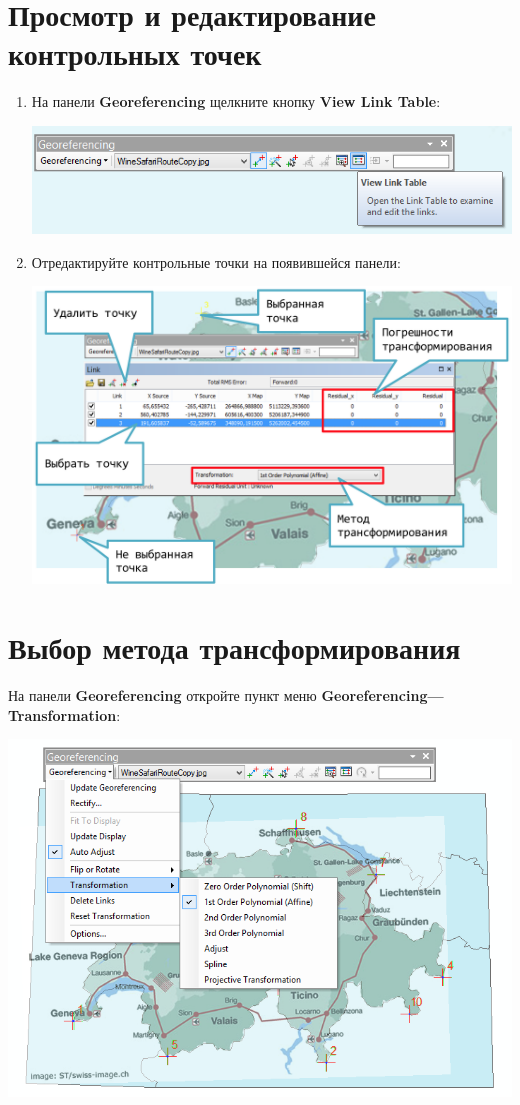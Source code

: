 \documentclass[]{book}
\theoremstyle{definition}
\theoremstyle{definition}
\theoremstyle{definition}
\theoremstyle{remark}
\begin{document}
\hypertarget{----}{%
\section{Просмотр и редактирование контрольных точек}\label{----}}

\begin{enumerate}
\def\labelenumi{\arabic{enumi}.}
\item
  На панели \textbf{Georeferencing} щелкните кнопку \textbf{View Link
  Table}:

  \includegraphics{images/Appendix/image84.png}
\item
  Отредактируйте контрольные точки на появившейся панели:

  \includegraphics{images/Appendix/image85.png}
\end{enumerate}

\hypertarget{--}{%
\section{Выбор метода трансформирования}\label{--}}

На панели \textbf{Georeferencing} откройте пункт меню
\textbf{Georeferencing---Transformation}:

\includegraphics{images/Appendix/image86.png}
\end{document}
